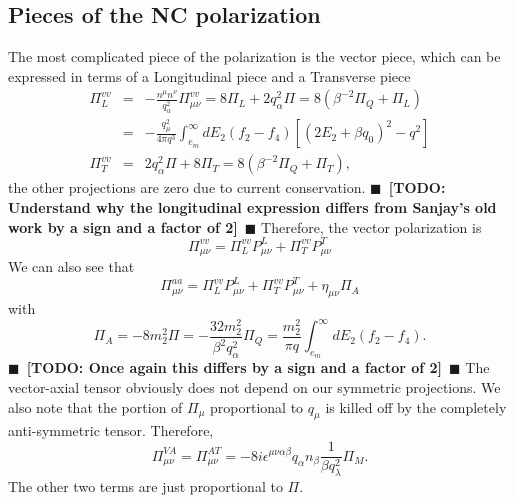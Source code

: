 \documentclass[12pt,letter]{article}
\newcommand{\todo}[1]{{$\blacksquare$~\textbf{\color{blue}[TODO: #1]}}~$\blacksquare$}
\begin{document}
\subsection{Pieces of the NC polarization}
The most complicated piece of the polarization is the vector piece, which can be 
expressed in terms of a Longitudinal piece and a Transverse piece 
\begin{eqnarray}
\Pi_L^{vv} &=& -\frac{n^\mu n^\nu}{q_\alpha^2} \Pi^{vv}_{\mu \nu} 
= 8 \Pi_L + 2 q_\alpha^2 \Pi = 8(\beta^{-2} \Pi_Q + \Pi_L) \nonumber \\
&=& -\frac{q_\mu^2}{4 \pi q^3} \int_{e_m}^\infty dE_2 (f_2 - f_4) 
\left[(2 E_2 + \beta q_0)^2 - q^2 \right] \\
\Pi_T^{vv} &=& 2 q_\alpha^2 \Pi + 8 \Pi_T = 8 (\beta^{-2} \Pi_Q + \Pi_T), 
\end{eqnarray}
the other projections are zero due to current conservation. 
\todo{Understand why the longitudinal expression differs from Sanjay's old work 
by a sign and a factor of 2} Therefore, the vector polarization is 
\begin{equation}
\Pi^{vv}_{\mu \nu} = \Pi^{vv}_L P^L_{\mu \nu} + \Pi^{vv}_T P^T_{\mu \nu}
\end{equation}
We can also see that 
\begin{equation}
\Pi^{aa}_{\mu \nu} = \Pi^{vv}_L P^L_{\mu \nu} + \Pi^{vv}_T P^T_{\mu \nu} 
+ \eta_{\mu \nu} \Pi_A
\end{equation}
with 
\begin{equation}
\Pi_A =-8 m_2^2 \Pi = -\frac{32 m_2^2}{\beta^2 q_\alpha^2} \Pi_Q
= \frac{m_2^2}{\pi q} \int_{e_m}^\infty dE_2 (f_2 - f_4). 
\end{equation}
\todo{Once again this differs by a sign and a factor of 2} 
The vector-axial tensor obviously does not depend on our symmetric projections.
We also note that the portion of $\Pi_\mu$ proportional to $q_\mu$ is killed off
by the completely anti-symmetric tensor. Therefore,
\begin{equation}
\Pi^{VA}_{\mu \nu} = \Pi^{AT}_{\mu \nu} 
=- 8 i \epsilon^{\mu \nu \alpha \beta} q_\alpha n_\beta \frac{1}{\beta q_\lambda^2}
\Pi_M.
\end{equation}
The other two terms are just proportional to $\Pi$.
\end{document}
